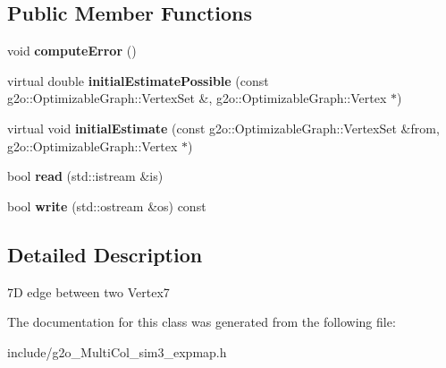 \subsection*{Public Member Functions}
\begin{DoxyCompactItemize}
\item 
void {\bfseries compute\+Error} ()\hypertarget{classMultiColSLAM_1_1EdgeSim3__Multi_aff9595501c9848f7c94de92146723abb}{}\label{classMultiColSLAM_1_1EdgeSim3__Multi_aff9595501c9848f7c94de92146723abb}

\item 
virtual double {\bfseries initial\+Estimate\+Possible} (const g2o\+::\+Optimizable\+Graph\+::\+Vertex\+Set \&, g2o\+::\+Optimizable\+Graph\+::\+Vertex $\ast$)\hypertarget{classMultiColSLAM_1_1EdgeSim3__Multi_a84ca699f4b20eaa9b1c284dee3fde36e}{}\label{classMultiColSLAM_1_1EdgeSim3__Multi_a84ca699f4b20eaa9b1c284dee3fde36e}

\item 
virtual void {\bfseries initial\+Estimate} (const g2o\+::\+Optimizable\+Graph\+::\+Vertex\+Set \&from, g2o\+::\+Optimizable\+Graph\+::\+Vertex $\ast$)\hypertarget{classMultiColSLAM_1_1EdgeSim3__Multi_af0e904350e4b73ea998a8372d8e96579}{}\label{classMultiColSLAM_1_1EdgeSim3__Multi_af0e904350e4b73ea998a8372d8e96579}

\item 
bool {\bfseries read} (std\+::istream \&is)\hypertarget{classMultiColSLAM_1_1EdgeSim3__Multi_a3172ba87b4a6c70e00a8c004e43ef4ac}{}\label{classMultiColSLAM_1_1EdgeSim3__Multi_a3172ba87b4a6c70e00a8c004e43ef4ac}

\item 
bool {\bfseries write} (std\+::ostream \&os) const \hypertarget{classMultiColSLAM_1_1EdgeSim3__Multi_afb9777e092f7aaf9f72d722c262eac6d}{}\label{classMultiColSLAM_1_1EdgeSim3__Multi_afb9777e092f7aaf9f72d722c262eac6d}

\end{DoxyCompactItemize}


\subsection{Detailed Description}
7D edge between two Vertex7 

The documentation for this class was generated from the following file\+:\begin{DoxyCompactItemize}
\item 
include/g2o\+\_\+\+Multi\+Col\+\_\+sim3\+\_\+expmap.\+h\end{DoxyCompactItemize}
